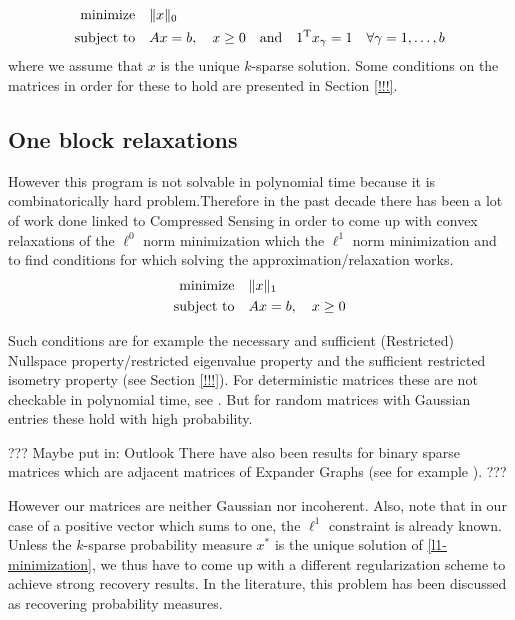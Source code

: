 \documentclass{article} %
\begin{document}
\begin{equation}\label{l0-minimization}
  \begin{split}
    \text{minimize} &\quad \lVert x\rVert_0\\
    \text{subject to} &\quad Ax = b,\quad x\geq 0\quad \text{and}\quad 1^{\rm T} x_{\gamma} = 1\quad \forall \gamma=1,\dots, b
  \end{split}
\end{equation}
where we assume that $x$ is the unique $k$-sparse solution. Some conditions on the matrices in order for these to hold are presented in Section \ref{!!!}.

\subsection{One block relaxations}
\label{Relaxations}

However this program is not solvable in polynomial time because it is combinatorically hard problem.Therefore in the past decade there has been a lot of work done linked to Compressed Sensing in order to come up with convex relaxations of the $\ell^0$ norm minimization which the $\ell^1$ norm minimization and to find conditions for which solving the approximation/relaxation works.
\begin{equation}\label{l1-minimization}
  \begin{split}
    \text{minimize} &\quad \lVert x\rVert_1\\
    \text{subject to} &\quad Ax = b,\quad x\geq 0
  \end{split}
\end{equation}

Such conditions are for example the necessary and sufficient (Restricted) Nullspace property/restricted eigenvalue property and the sufficient restricted isometry property (see Section \ref{!!!}).
For deterministic matrices these are not checkable in polynomial time, see \cite{DonohoCheckable}. But for random matrices with Gaussian entries these hold with high probability. 

??? Maybe put in: Outlook There have also been results for binary sparse matrices which are adjacent matrices of Expander Graphs (see for example \cite{Indyk_Unified}). ???

However our matrices are neither Gaussian nor incoherent. Also, note that in our case of a positive vector which sums to one, the $\ell^1$ constraint is already known. Unless the $k$-sparse probability measure $x^*$ is the unique solution of \eqref{l1-minimization}, we thus have to come up with a different regularization scheme to achieve strong recovery results. In the literature, this problem has been discussed as recovering probability measures. 
\end{document}
